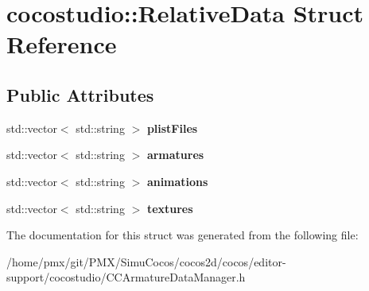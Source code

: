 \hypertarget{structcocostudio_1_1RelativeData}{}\section{cocostudio\+:\+:Relative\+Data Struct Reference}
\label{structcocostudio_1_1RelativeData}
\subsection*{Public Attributes}
\begin{DoxyCompactItemize}
\item 
\mbox{\label{structcocostudio_1_1RelativeData_a72142c8a261f87475f62bbc70b5a9783}} 
std\+::vector$<$ std\+::string $>$ {\bfseries plist\+Files}
\item 
\mbox{\label{structcocostudio_1_1RelativeData_a286d670054a12d238e96054f9e1868e0}} 
std\+::vector$<$ std\+::string $>$ {\bfseries armatures}
\item 
\mbox{\label{structcocostudio_1_1RelativeData_aa1db7838d76933f9ce5d10c2d6ac7c76}} 
std\+::vector$<$ std\+::string $>$ {\bfseries animations}
\item 
\mbox{\label{structcocostudio_1_1RelativeData_ac09f885fbdf9ae36c7b2d9fd01a7b315}} 
std\+::vector$<$ std\+::string $>$ {\bfseries textures}
\end{DoxyCompactItemize}


The documentation for this struct was generated from the following file\+:\begin{DoxyCompactItemize}
\item 
/home/pmx/git/\+P\+M\+X/\+Simu\+Cocos/cocos2d/cocos/editor-\/support/cocostudio/C\+C\+Armature\+Data\+Manager.\+h\end{DoxyCompactItemize}
